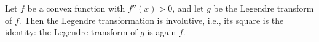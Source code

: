 Let $f$ be a convex function with $f''(x) > 0$, and let $g$ be the Legendre transform of $f$. Then the Legendre transformation is involutive, i.e., its square is the identity: the Legendre transform of $g$ is again $f$.
